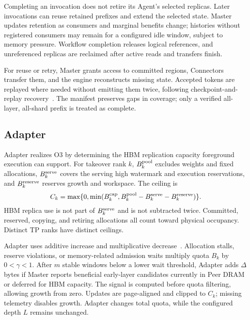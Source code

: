 Completing an invocation does not retire its Agent's selected replicas.
Later invocations can reuse retained prefixes and extend the selected
state. Master updates retention as consumers and marginal benefits
change; histories without registered consumers may remain for a
configured idle window, subject to memory pressure. Workflow completion
releases logical references, and unreferenced replicas are reclaimed
after active reads and transfers finish.

For reuse or retry, Master grants access to committed regions,
Connectors transfer them, and the engine reconstructs missing state.
Accepted tokens are replayed where needed without emitting them twice,
following checkpoint-and-replay recovery~\cite{strati2024dejavu,cao2026lumen}.
The manifest preserves gaps in coverage; only a verified all-layer,
all-shard prefix is treated as complete.

\subsection{Adapter}
\label{sec:capacity}

Adapter realizes O3 by determining the HBM replication capacity
foreground execution can support. For takeover rank $k$,
$B^{\rm pool}_k$ excludes weights and fixed allocations,
$B^{\rm serve}_k$ covers the serving high watermark and execution
reservations, and $B^{\rm reserve}_k$ reserves growth and workspace.
The ceiling is
\begin{equation}
 C_k=\max\{0,\min(B^{\rm cap}_k,
 B^{\rm pool}_k-B^{\rm serve}_k-B^{\rm reserve}_k)\}.
 \label{eq:ceiling}
\end{equation}
HBM replica use is not part of $B^{\rm serve}_k$ and is not subtracted twice.
Committed, reserved, copying, and retiring allocations all count toward
physical occupancy. Distinct TP ranks have distinct ceilings.

Adapter uses additive increase and multiplicative
decrease~\cite{chiu1989aimd}. Allocation stalls, reserve violations, or
memory-related admission waits multiply quota $B_k$ by $0<\gamma<1$.
After $m$ stable windows below a lower wait threshold, Adapter adds
$\Delta$ bytes if Master reports beneficial early-layer candidates
currently in Peer DRAM or deferred for HBM capacity. The signal is computed
before quota filtering, allowing growth from zero. Updates are
page-aligned and clipped to $C_k$; missing telemetry disables growth.
Adapter changes total quota, while the configured depth $L$ remains
unchanged.

